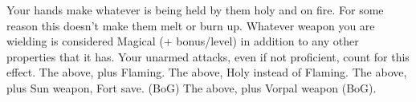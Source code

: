 \combatfeat
{Your hands make whatever is being held by them holy and on fire. For some reason this doesn't make them melt or burn up.}
{Whatever weapon you are wielding is considered Magical (+ bonus/level) in addition to any other properties that it has. Your unarmed attacks, even if not proficient, count for this effect.}
{The above, plus Flaming.}
{The above, Holy instead of Flaming.}
{The above, plus Sun weapon, Fort save. (BoG)}
{The above, plus Vorpal weapon (BoG).}